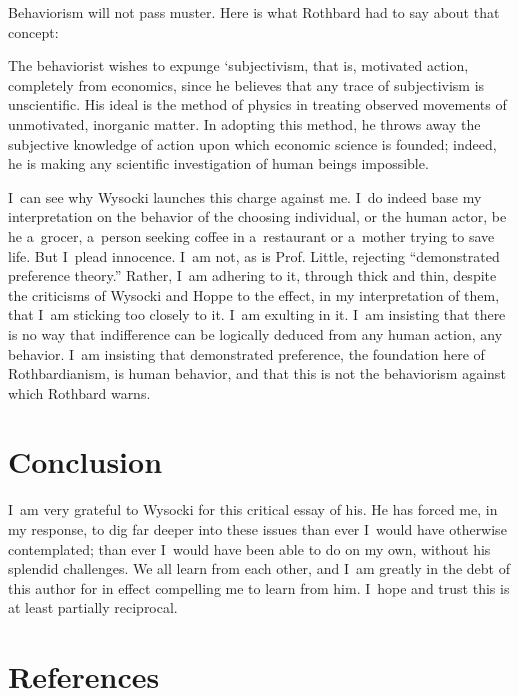 Behaviorism will not pass muster. Here is what Rothbard 
\parencite*[][]{rothbard_toward_2011} %
 had to say about that concept:



The behaviorist wishes to expunge ‘subjectivism, that is, motivated action, completely from economics, since he believes that any trace of subjectivism is unscientific. His ideal is the method of physics in treating observed movements of unmotivated, inorganic matter. In adopting this method, he throws away the subjective knowledge of action upon which economic science is founded; indeed, he is making any scientific investigation of human beings impossible.



I~can see why Wysocki launches this charge against me. I~do indeed base my interpretation on the behavior of the choosing individual, or the human actor, be he a~grocer, a~person seeking coffee in a~restaurant or a~mother trying to save life. But I~plead innocence. I~am not, as is Prof. Little, rejecting ``demonstrated preference theory.'' Rather, I~am adhering to it, through thick and thin, despite the criticisms of Wysocki and Hoppe to the effect, in my interpretation of them, that I~am sticking too closely to it. I~am exulting in it. I~am insisting that there is no way that indifference can be logically deduced from any human action, any behavior. I~am insisting that demonstrated preference, the foundation here of Rothbardianism, is human behavior, and that this is not the behaviorism against which Rothbard warns.



\section{Conclusion}

I~am very grateful to Wysocki for this critical essay of his. He has forced me, in my response, to dig far deeper into these issues than ever I~would have otherwise contemplated; than ever I~would have been able to do on my own, without his splendid challenges. We all learn from each other, and I~am greatly in the debt of this author for in effect compelling me to learn from him. I~hope and trust this is at least partially reciprocal.



\section{References}




